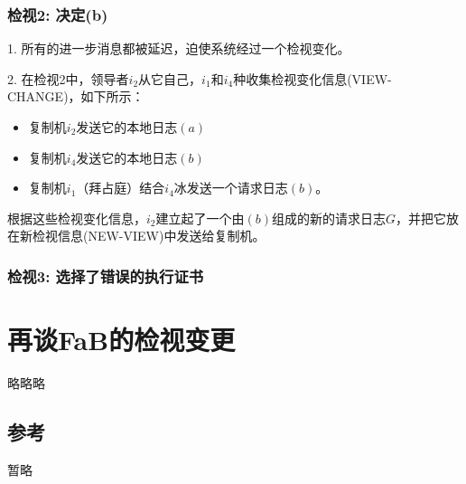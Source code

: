 \documentclass[UTF8]{ctexart}
\begin{document}
\subsubsection*{检视2: 决定(b)}
1. 所有的进一步消息都被延迟，迫使系统经过一个检视变化。

2. 在检视2中，领导者$i_2$从它自己，$i_1$和$i_4$种收集检视变化信息(VIEW-CHANGE)，如下所示：
\begin{itemize}
  \item 复制机$i_2$发送它的本地日志$(a)$
  \item 复制机$i_4$发送它的本地日志$(b)$
  \item 复制机$i_1$（拜占庭）结合$i_4$冰发送一个请求日志$(b)$。
\end{itemize}
根据这些检视变化信息，$i_2$建立起了一个由$(b)$组成的新的请求日志$G$，并把它放在新检视信息(NEW-VIEW)中发送给复制机。


\subsubsection*{检视3: 选择了错误的执行证书}

\section{再谈FaB的检视变更}\label{sec:FaB}
略略略

\subsection*{参考}
暂略
\end{document}
